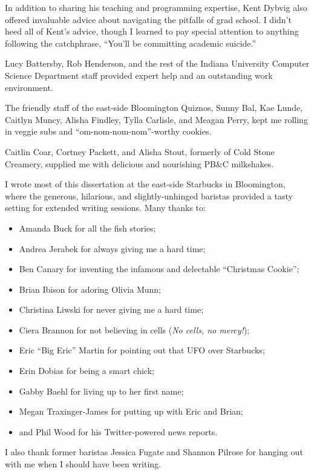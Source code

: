 In addition to sharing his teaching and programming expertise, Kent
Dybvig also offered invaluable advice about navigating the pitfalls of
grad school.  I didn't heed all of Kent's advice, though I learned to
pay special attention to anything following the catchphrase, ``You'll
be committing academic suicide.''

Lucy Battersby, Rob Henderson, and the rest of the Indiana University
Computer Science Department staff provided expert help and an
outstanding work environment.

The friendly staff of the east-side Bloomington Quiznos, Sunny Bal,
Kae Lunde, Caitlyn Muncy, Alisha Findley, Tylla Carlisle, and Meagan
Perry, kept me rolling in veggie subs and ``om-nom-nom-nom''-worthy
cookies.

Caitlin Coar, Cortney Packett, and Alisha Stout, formerly of Cold
Stone Creamery, supplied me with delicious and nourishing PB\&C
milkshakes.

I wrote most of this dissertation at the east-side Starbucks in
Bloomington, where the generous, hilarious, and slightly-unhinged
baristas provided a tasty setting for extended writing sessions.  Many
thanks to:

\begin{itemize}
\item Amanda Buck for all the fish stories;
\item Andrea Jerabek for always giving me a hard time;
\item Ben Canary for inventing the infamous and delectable ``Christmas Cookie'';
\item Brian Ibison for adoring Olivia Munn;
\item Christina Liwski for never giving me a hard time;
\item Ciera Brannon for not believing in cells (\emph{No cells, no mercy!});
\item Eric ``Big Eric'' Martin for pointing out that UFO over Starbucks;
\item Erin Dobias for being a smart chick;
\item Gabby Baehl for living up to her first name;
\item Megan Traxinger-James for putting up with Eric and Brian;
\item and Phil Wood for his Twitter-powered news reports.
\end{itemize}

\noindent I also thank former baristas Jessica Fugate and Shannon
Pilrose for hanging out with me when I should have been writing.

